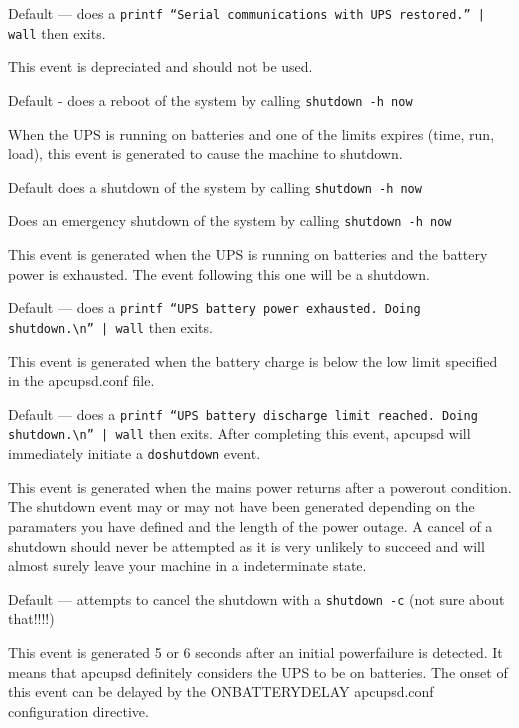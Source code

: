 {{{{{{{{\begin{description}
Default {---} does a {\tt printf ``Serial communications with UPS restored.''
| wall} then exits.  

\item [doreboot]
   This event is depreciated and should not be used.  

Default - does a reboot of the system by calling {\tt shutdown -h now}  

\item [doshutdown]
   When the UPS is running on batteries and one of the limits expires (time, run,
load), this event is generated to cause the machine to shutdown.  

Default does a shutdown of the system by calling {\tt shutdown -h now}  

\item [emergency]
   Does an emergency shutdown of the system by calling {\tt shutdown -h now}  

\item [failing]
   This event is generated when the UPS is running on batteries and the battery
power is exhausted. The event following this one will be a shutdown.  

Default {---} does a {\tt printf ``UPS battery power exhausted. Doing
shutdown.\textbackslash{}n'' | wall} then exits.  

\item [loadlimit]
   This event is generated when the battery charge is below the low limit
specified in the apcupsd.conf file.  

Default {---} does a {\tt printf ``UPS battery discharge limit reached. Doing
shutdown.\textbackslash{}n'' | wall} then exits.  After completing this event,
apcupsd will immediately initiate a {\tt doshutdown} event.  

\item [mainsback]
   This event is generated when the mains power returns after a powerout
condition. The shutdown event may or may not have been generated depending on
the paramaters you have defined and the length of the power outage. A cancel
of a shutdown should never be attempted as it is very unlikely to succeed and
will almost surely leave your machine in a indeterminate state.  

Default {---} attempts to cancel the shutdown with a {\tt shutdown -c} (not
sure about that!!!!)  

\item [onbattery]
   This event is generated 5 or 6 seconds after an initial powerfailure is
detected. It means that apcupsd definitely considers the UPS to be on
batteries. The onset of this event can be delayed by the ONBATTERYDELAY
apcupsd.conf configuration directive.  


\end{description}}}}}}}}}

